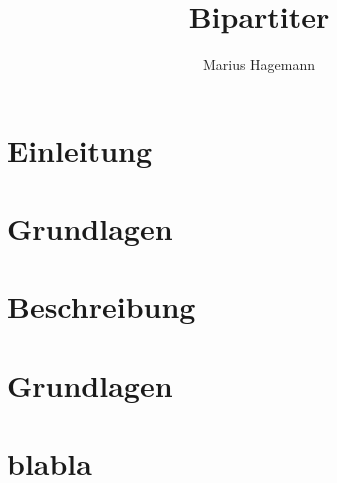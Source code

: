 \documentclass[a1,portrait]{a0poster}
\author{Marius Hagemann}
\title{Bipartiter \gc{}}
\begin{document}
\parindent0mm


\begin{multicols}{2}
	


\section{Einleitung}


\section{Grundlagen}



\section{Beschreibung}



\section{Grundlagen}


\section{blabla}









\end{multicols}








\end{document}
